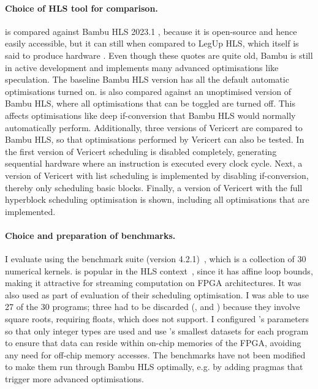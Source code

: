 \paragraph{Choice of HLS tool for comparison.} \vericert{} is compared against
Bambu HLS 2023.1 \cite{ferrandi21_bambu}, because it is open-source and hence
easily accessible, but it can still
 when compared to LegUp HLS, which itself is said to produce
hardware .  Even though these quotes are quite
old, Bambu is still in active development and implements many advanced
optimisations like speculation.  The baseline Bambu HLS version has all the
default automatic optimisations turned on.  \vericert{} is also compared against
an unoptimised version of Bambu HLS, where all optimisations that can be toggled
are turned off.  This affects optimisations like deep \gls{if-conversion} that Bambu
HLS would normally automatically perform.  Additionally, three versions of
Vericert are compared to Bambu HLS, so that optimisations performed by Vericert
can also be tested.  In the first version of Vericert scheduling is disabled
completely, generating sequential hardware where an instruction is executed
every clock cycle.  Next, a version of Vericert with list scheduling is
implemented by disabling if-conversion, thereby only scheduling basic blocks.
Finally, a version of Vericert with the full hyperblock scheduling optimisation
is shown, including all optimisations that are implemented.

\paragraph{Choice and preparation of benchmarks.} I evaluate \vericert{} using
the \polybench{} benchmark suite (version 4.2.1)~\cite{pouchet20_polyb_c}, which
is a collection of 30 numerical kernels. \polybench{} is popular in the HLS
context~\cite{choi18_hbods,pouchet13_polyh,zhao17_comba,zuo13_improv}, since it
has affine loop bounds, making it attractive for streaming computation on FPGA
architectures.  It was also used as part of
\textcite{six22_formal_verif_super_sched} evaluation of their scheduling
optimisation.  I was able to use 27 of the 30 programs; three had to be
discarded (,  and
) because they involve square roots, requiring floats, which
\vericert{} does not support.  I configured \polybench{}'s parameters so that
only integer types are used and use \polybench{}'s smallest datasets for each
program to ensure that data can reside within on-chip memories of the FPGA,
avoiding any need for off-chip memory accesses. The benchmarks have not been
modified to make them run through Bambu HLS optimally, e.g. by adding pragmas
that trigger more advanced optimisations.

